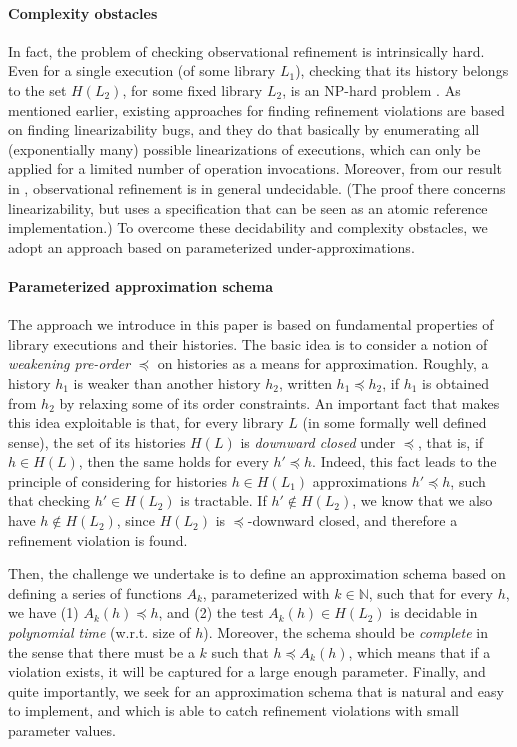 \paragraph{Complexity obstacles}

In fact, the problem of checking observational refinement is intrinsically
hard. Even for a single execution (of some library $L_1$), checking that its
history belongs to the set $H(L_2)$, for some fixed library $L_2$, is an
NP-hard problem \cite{}. As mentioned earlier, existing approaches for finding
refinement violations are based on finding linearizability bugs, and they do
that basically by enumerating all (exponentially many) possible linearizations
of executions, which can only be applied for a limited number of operation
invocations. Moreover, from our result in \cite{}, observational refinement is
in general undecidable. (The proof there concerns linearizability, but uses a
specification that can be seen as an atomic reference implementation.) To
overcome these decidability and complexity obstacles, we adopt an approach
based on parameterized under-approximations.

\paragraph{Parameterized approximation schema}

The approach we introduce in this paper is based on fundamental properties of
library executions and their histories. The basic idea is to consider a notion
of \emph{ weakening pre-order} $\preceq$ on histories as a means for
approximation. Roughly, a history $h_1$ is weaker than another history $h_2$,
written $h_1 \preceq h_2$, if $h_1$ is obtained from $h_2$ by relaxing some of
its order constraints. An important fact that makes this idea exploitable is
that, for every library $L$ (in some formally well defined sense), the set of
its histories $H(L)$ is \emph{downward closed} under $\preceq$, that is, if $h
\in H(L)$, then the same holds for every $h' \preceq h$. Indeed, this fact
leads to the principle of considering for histories $h \in H(L_1)$
approximations $h' \preceq h$, such that checking $h' \in H(L_2)$ is tractable.
If $h' \not\in H(L_2)$, we know that we also have $h \not\in H(L_2)$, since
$H(L_2)$ is $\preceq$-downward closed, and therefore a refinement violation is
found.

Then, the challenge we undertake is to define an approximation schema based on
defining a series of functions $A_k$, parameterized with $k \in \mathbb{N}$,
such that for every $h$, we have (1) $A_k (h) \preceq h$, and (2) the test
$A_k(h) \in H(L_2)$ is decidable in \emph{polynomial time} (w.r.t. size of
$h$). Moreover, the schema should be \emph{complete} in the sense that there
must be a $k$ such that $h \preceq A_k(h)$, which means that if a violation
exists, it will be captured for a large enough parameter. Finally, and quite
importantly, we seek for an approximation schema that is natural and easy to
implement, and which is able to catch refinement violations with small
parameter values.


